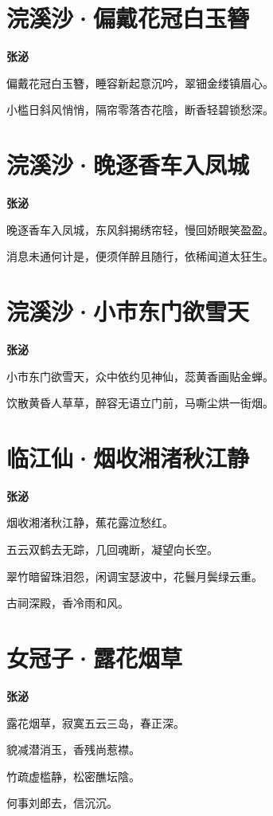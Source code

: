 \documentclass[12pt,a4paper]{ctexbook}
\begin{document}
\section{浣溪沙·偏戴花冠白玉簪}
\textbf{张泌}\par\vspace{0.5em}
偏戴花冠白玉簪，睡容新起意沉吟，翠钿金缕镇眉心。\par
小槛日斜风悄悄，隔帘零落杏花陰，断香轻碧锁愁深。\par

\section{浣溪沙·晚逐香车入凤城}
\textbf{张泌}\par\vspace{0.5em}
晚逐香车入凤城，东风斜揭绣帘轻，慢回娇眼笑盈盈。\par
消息未通何计是，便须佯醉且随行，依稀闻道太狂生。\par

\section{浣溪沙·小市东门欲雪天}
\textbf{张泌}\par\vspace{0.5em}
小市东门欲雪天，众中依约见神仙，蕊黄香画贴金蝉。\par
饮散黄昏人草草，醉容无语立门前，马嘶尘烘一街烟。\par

\section{临江仙·烟收湘渚秋江静}
\textbf{张泌}\par\vspace{0.5em}
烟收湘渚秋江静，蕉花露泣愁红。\par
五云双鹤去无踪，几回魂断，凝望向长空。\par
翠竹暗留珠泪怨，闲调宝瑟波中，花鬟月鬓绿云重。\par
古祠深殿，香冷雨和风。\par

\section{女冠子·露花烟草}
\textbf{张泌}\par\vspace{0.5em}
露花烟草，寂寞五云三岛，春正深。\par
貌减潜消玉，香残尚惹襟。\par
竹疏虚槛静，松密醮坛陰。\par
何事刘郎去，信沉沉。\par
\end{document}
